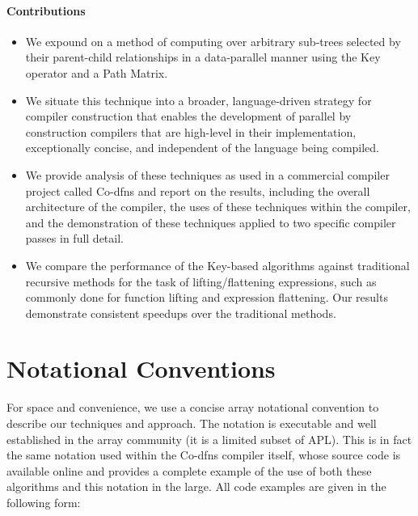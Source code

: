 ﻿\documentclass[numbers,10pt,preprint]{sigplanconf}
\begin{document}
\paragraph{Contributions}

\begin{itemize}[noitemsep]

\item We expound on a method \cite{hsu2016key} of computing over arbitrary sub-trees selected by their parent-child relationships in a data-parallel manner using the Key operator and a Path Matrix.

\item We situate this technique into a broader, language-driven strategy for compiler construction that enables the development of parallel by construction compilers that are high-level in their implementation, exceptionally concise, and independent of the language being compiled.

\item We provide analysis of these techniques as used in a commercial compiler project called Co-dfns and report on the results, including the overall architecture of the compiler, the uses of these techniques within the compiler, and the demonstration of these techniques applied to two specific compiler passes in full detail.

\item We compare the performance of the Key-based algorithms against traditional recursive methods for the task of lifting/flattening expressions, such as commonly done for function lifting and expression flattening. Our results demonstrate consistent speedups over the traditional methods.

\end{itemize}

\section{Notational Conventions}

For space and convenience, we use a concise array notational convention to describe our techniques and approach. The notation is executable and well established in the array community (it is a limited subset of APL). This is in fact the same notation used within the Co-dfns compiler itself, whose source code is available online and provides a complete example of the use of both these algorithms and this notation in the large. All code examples are given in the following form:
\end{document}
